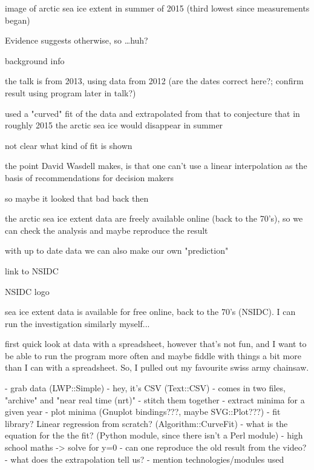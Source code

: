 \documentclass[notes]{beamer}
\begin{document}
\begin{frame}

    image of arctic sea ice extent in summer of 2015 (third lowest since
    measurements began)

    Evidence suggests otherwise, so \ldots huh?

\end{frame}

\begin{frame}

    background info

    the talk is from 2013, using data from 2012 (are the dates correct
    here?; confirm result using program later in talk?)

    used a "curved" fit of the data and extrapolated from that to conjecture
    that in roughly 2015 the arctic sea ice would disappear in summer

    not clear what kind of fit is shown

    the point David Wasdell makes, is that one can't use a linear
    interpolation as the basis of recommendations for decision makers

    so maybe it looked that bad back then

\end{frame}

\begin{frame}

    the arctic sea ice extent data are freely available online (back to the
    70's), so we can check the analysis and maybe reproduce the result

    with up to date data we can also make our own "prediction"

    link to NSIDC

    NSIDC logo

\end{frame}

\begin{frame}
sea ice extent data is available for free online, back to the 70's (NSIDC).  I can
run the investigation similarly myself...
\end{frame}

first quick look at data with a spreadsheet, however that's not fun, and I
want to be able to run the program more often and maybe fiddle with things a
bit more than I can with a spreadsheet.  So, I pulled out my favourite swiss
army chainsaw.

- grab data (LWP::Simple)
- hey, it's CSV (Text::CSV)
- comes in two files, "archive" and "near real time (nrt)"
- stitch them together
- extract minima for a given year
- plot minima (Gnuplot bindings???, maybe SVG::Plot???)
- fit library?  Linear regression from scratch?  (Algorithm::CurveFit)
- what is the equation for the the fit?  (Python module, since there isn't a
Perl module)
- high school maths -> solve for y=0
- can one reproduce the old result from the video?
- what does the extrapolation tell us?
- mention technologies/modules used
\end{document}
